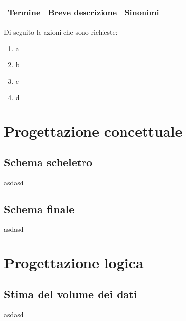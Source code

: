 \documentclass[a4paper,12pt]{report}
\begin{document}
            \begin{center}
                 \begin{tabular}{|c c c|} 
                     \hline
                     Termine & Breve descrizione & Sinonimi \\ [0.5ex] 
                     \hline
                \end{tabular}
            \end{center}
            
            Di seguito le azioni che sono richieste:
            
            \begin{enumerate}
              \item a
              \item b
              \item c
              \item d
              
            \end{enumerate}


	\chapter*{Progettazione concettuale}
	
    	\section*{Schema scheletro}
        	asdasd
        	
    	\section*{Schema finale}
        	asdasd
        	


        	
	\chapter*{Progettazione logica}
    	\section*{Stima del volume dei dati}
        	asdasd
         	
\end{document}
